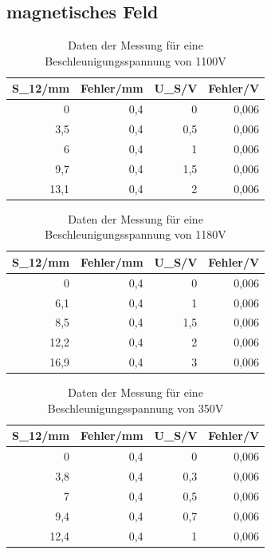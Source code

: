 \documentclass[12pt]{scrartcl}
\begin{document}
\newpage

\subsection{magnetisches Feld}


\begin{table}[htbp]
\caption{Daten der Messung für eine Beschleunigungsspannung von 1100V}
\begin{center}
\begin{tabular}{|r|r|r|r|}
\hline
\multicolumn{1}{|l|}{S\_12/mm} & \multicolumn{1}{l|}{Fehler/mm} & \multicolumn{1}{l|}{U\_S/V} & \multicolumn{1}{l|}{Fehler/V} \\ \hline
0 & 0,4 & 0 & 0,006 \\ \hline
3,5 & 0,4 & 0,5 & 0,006 \\ \hline
6 & 0,4 & 1 & 0,006 \\ \hline
9,7 & 0,4 & 1,5 & 0,006 \\ \hline
13,1 & 0,4 & 2 & 0,006 \\ \hline
\end{tabular}
\end{center}
\label{tab:materialeigenschaften}
\end{table}


\begin{table}[htbp]
\caption{Daten der Messung für eine Beschleunigungsspannung von 1180V}
\begin{center}
\begin{tabular}{|r|r|r|r|}
\hline
\multicolumn{1}{|l|}{S\_12/mm} & \multicolumn{1}{l|}{Fehler/mm} & \multicolumn{1}{l|}{U\_S/V} & \multicolumn{1}{l|}{Fehler/V} \\ \hline
0 & 0,4 & 0 & 0,006 \\ \hline
6,1 & 0,4 & 1 & 0,006 \\ \hline
8,5 & 0,4 & 1,5 & 0,006 \\ \hline
12,2 & 0,4 & 2 & 0,006 \\ \hline
16,9 & 0,4 & 3 & 0,006 \\ \hline
\end{tabular}
\end{center}
\label{tab:materialeigenschaften}
\end{table}


\begin{table}[htbp]
\caption{Daten der Messung für eine Beschleunigungsspannung von 350V}
\begin{center}
\begin{tabular}{|r|r|r|r|}
\hline
\multicolumn{1}{|l|}{S\_12/mm} & \multicolumn{1}{l|}{Fehler/mm} & \multicolumn{1}{l|}{U\_S/V} & \multicolumn{1}{l|}{Fehler/V} \\ \hline
0 & 0,4 & 0 & 0,006 \\ \hline
3,8 & 0,4 & 0,3 & 0,006 \\ \hline
7 & 0,4 & 0,5 & 0,006 \\ \hline
9,4 & 0,4 & 0,7 & 0,006 \\ \hline
12,4 & 0,4 & 1 & 0,006 \\ \hline
\end{tabular}
\end{center}
\label{tab:materialeigenschaften}
\end{table}
\end{document}
